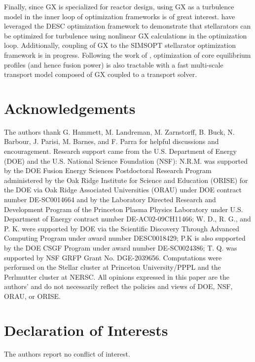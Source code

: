 \documentclass{jpp}
\newcommand{\GX}{{GX}\xspace}
\begin{document}
Finally, since \GX is specialized for reactor design, using \GX as a turbulence model in the inner loop of optimization frameworks is of great interest. \citet{Kim2024} have leveraged the DESC \citep{dudt2022} optimization framework to demonstrate that stellarators can be optimized for turbulence using nonlinear \GX calculations in the optimization loop. Additionally, coupling of \GX to the SIMSOPT stellarator optimization framework \citep{Landreman2021} is in progress. Following the work of \citet{Highcock2018}, optimization of core equilibrium profiles (and hence fusion power) is also tractable with a fast multi-scale transport model composed of \GX coupled to a transport solver.

\section{Acknowledgements}

The authors thank G. Hammett, M. Landreman, M. Zarnstorff, B. Buck, N. Barbour, J. Parisi, M. Barnes, and F. Parra for helpful discussions and encouragement.
Research support came from the U.S. Department of Energy (DOE) and the U.S. National Science Foundation (NSF): N.R.M. was supported by the DOE Fusion Energy Sciences Postdoctoral Research Program
administered by the Oak Ridge Institute for Science and Education (ORISE) for the DOE via Oak Ridge
Associated Universities (ORAU) under DOE contract number DE-SC0014664 and by the Laboratory Directed Research and Development Program of the Princeton Plasma Physics Laboratory under U.S. Department of Energy contract number DE-AC02-09CH11466; W. D., R. G., and P. K. were supported by DOE via the Scientific Discovery Through
Advanced Computing Program under award number DESC0018429; P.K is also supported by the DOE CSGF Program under award number DE-SC0024386; T. Q. was supported by NSF GRFP Grant No. DGE-2039656.  
Computations were performed on the Stellar cluster at Princeton University/PPPL and the Perlmutter cluster at NERSC. 
All opinions expressed in this paper are the authors'
and do not necessarily reflect the policies and views of DOE, NSF, ORAU, or ORISE.

\section{Declaration of Interests} The authors report no conflict of interest.


 \appendix
\end{document}
